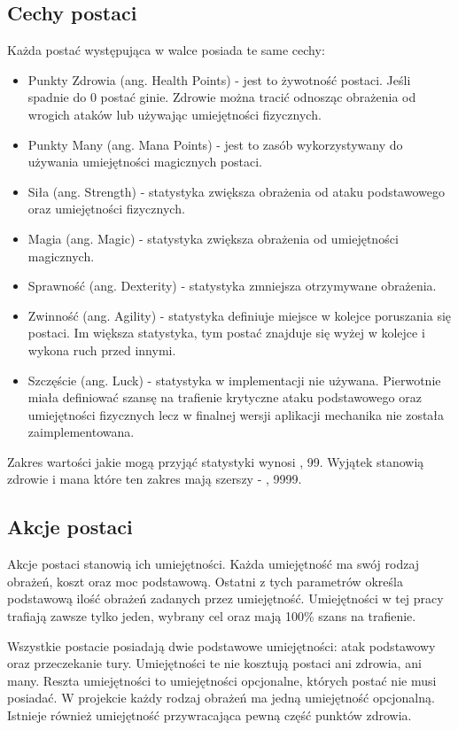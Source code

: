 \documentclass{SGGW-thesis}
\begin{document}
\subsection{Cechy postaci}
Każda postać występująca w walce posiada te same cechy:
\begin{itemize}
  \item Punkty Zdrowia (ang. Health Points) - jest to żywotność postaci. Jeśli spadnie do 0 postać ginie. Zdrowie można tracić odnosząc obrażenia od wrogich ataków lub używając umiejętności fizycznych.
  \item Punkty Many (ang. Mana Points) - jest to zasób wykorzystywany do używania umiejętności magicznych postaci.
  \item Siła (ang. Strength) - statystyka zwiększa obrażenia od ataku podstawowego oraz umiejętności fizycznych.
  \item Magia (ang. Magic) - statystyka zwiększa obrażenia od umiejętności magicznych.
  \item Sprawność (ang. Dexterity) - statystyka zmniejsza otrzymywane obrażenia.
  \item Zwinność (ang. Agility) - statystyka definiuje miejsce w kolejce poruszania się postaci. Im większa statystyka, tym postać znajduje się wyżej w kolejce i wykona ruch przed innymi.
  \item Szczęście (ang. Luck) - statystyka w implementacji nie używana. Pierwotnie miała definiować szansę na trafienie krytyczne ataku podstawowego oraz umiejętności fizycznych lecz w finalnej wersji aplikacji mechanika nie została zaimplementowana.
\end{itemize}
Zakres wartości jakie mogą przyjąć statystyki wynosi , 99\textrangle. Wyjątek stanowią zdrowie i mana które ten zakres mają szerszy - , 9999\textrangle.
\pagebreak
\subsection{Akcje postaci}
Akcje postaci stanowią ich umiejętności. 
Każda umiejętność ma swój rodzaj obrażeń, koszt oraz moc podstawową. Ostatni z tych parametrów określa podstawową ilość obrażeń zadanych przez umiejętność.
Umiejętności w tej pracy trafiają zawsze tylko jeden, wybrany cel oraz mają 100\% szans na trafienie. 

Wszystkie postacie posiadają dwie podstawowe umiejętności: atak podstawowy oraz przeczekanie tury. Umiejętności te nie kosztują postaci ani zdrowia, ani many.
Reszta umiejętności to umiejętności opcjonalne, których postać nie musi posiadać. W projekcie każdy rodzaj obrażeń ma jedną umiejętność opcjonalną. 
Istnieje również umiejętność przywracająca pewną część punktów zdrowia.
\end{document}
